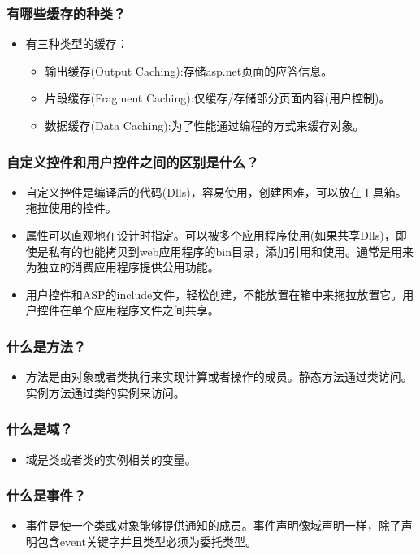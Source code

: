 \documentclass[9pt, b5paper]{article}
\begin{document}
\subsubsection{有哪些缓存的种类？}
\label{sec-1-2-2}
\begin{itemize}
\item 有三种类型的缓存：
\begin{itemize}
\item 输出缓存(Output Caching):存储asp.net页面的应答信息。
\item 片段缓存(Fragment Caching):仅缓存/存储部分页面内容(用户控制)。
\item 数据缓存(Data Caching):为了性能通过编程的方式来缓存对象。
\end{itemize}
\end{itemize}
\subsubsection{自定义控件和用户控件之间的区别是什么？}
\label{sec-1-2-3}
\begin{itemize}
\item 自定义控件是编译后的代码(Dlls)，容易使用，创建困难，可以放在工具箱。拖拉使用的控件。
\item 属性可以直观地在设计时指定。可以被多个应用程序使用(如果共享Dlls)，即使是私有的也能拷贝到web应用程序的bin目录，添加引用和使用。通常是用来为独立的消费应用程序提供公用功能。
\item 用户控件和ASP的include文件，轻松创建，不能放置在箱中来拖拉放置它。用户控件在单个应用程序文件之间共享。
\end{itemize}
\subsubsection{什么是方法？}
\label{sec-1-2-4}
\begin{itemize}
\item 方法是由对象或者类执行来实现计算或者操作的成员。静态方法通过类访问。实例方法通过类的实例来访问。
\end{itemize}
\subsubsection{什么是域？}
\label{sec-1-2-5}
\begin{itemize}
\item 域是类或者类的实例相关的变量。
\end{itemize}
\subsubsection{什么是事件？}
\label{sec-1-2-6}
\begin{itemize}
\item 事件是使一个类或对象能够提供通知的成员。事件声明像域声明一样，除了声明包含event关键字并且类型必须为委托类型。
\end{itemize}
\end{document}
